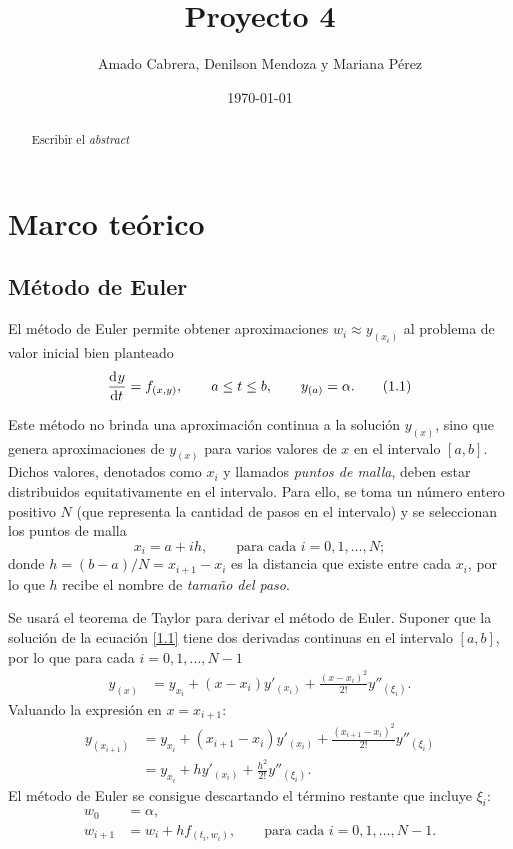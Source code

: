 \documentclass[english,spanish,Ce-table,Ce-theorem]{CabesHW}
\institute{Escuela de Ciencias Físicas y Matemática}
\title{Proyecto 4}
\author{Amado Cabrera, Denilson Mendoza y Mariana Pérez}
\date{\today}
\begin{document}
\maketitle

\begin{abstract}
Escribir el \textit{abstract}
\end{abstract}

\section{Marco teórico}
\subsection{Método de Euler}
El método de Euler permite obtener aproximaciones $w_i \approx y_{(x_i)}$ al problema de valor inicial bien planteado
\begin{align*}
\label{1.1}
    \td{y}{t} = f_{(x,y)}, \qquad a \leq t \leq b, \qquad y_{(a)} = \alpha. \tag{1.1}
\end{align*}

Este método no brinda una aproximación continua a la solución $y_{(x)}$, sino que genera aproximaciones de $y_{(x)}$ para varios valores de $x$ en el intervalo $[a, b]$. Dichos valores, denotados como $x_i$ y llamados \textit{puntos de malla}, deben estar distribuidos equitativamente en el intervalo. Para ello, se toma un número entero positivo $N$ (que representa la cantidad de pasos en el intervalo) y se seleccionan los puntos de malla
\[ x_i = a + ih, \qquad \text{para cada $i = 0, 1, \ldots, N$}; \]
donde $h = (b-a)/N = x_{i+1} - x_i$ es la distancia que existe entre cada $x_i$, por lo que $h$ recibe el nombre de \textit{tamaño del paso}.

Se usará el teorema de Taylor para derivar el método de Euler. Suponer que la solución de la ecuación  \eqref{1.1} tiene dos derivadas continuas en el intervalo $[a, b]$, por lo que para cada $i = 0, 1, \ldots, N-1$
\begin{align*}
     y_{(x)} &= y_{x_i} + (x-x_i)y'_{(x_i)} + \frac{(x-x_i)^2}{2!}y''_{(\xi_i)}.
\end{align*} 
Valuando la expresión en $x=x_{i+1}$:
\begin{align*}
     y_{(x_{i+1})} &= y_{x_i} + (x_{i+1}-x_i)y'_{(x_i)} + \frac{(x_{i+1}-x_i)^2}{2!}y''_{(\xi_i)}\\
     &= y_{x_i} + hy'_{(x_i)} + \frac{h^2}{2!}y''_{(\xi_i)}.
\end{align*}
El método de Euler se consigue descartando el término restante que incluye $\xi_i$:
\begin{align*}
    w_0 &= \alpha,\\
    w_{i+1} &= w_i + h f_{(t_i, w_i)}, \qquad \text{para cada $i = 0, 1, \ldots, N-1$}.
\end{align*}
\end{document}

